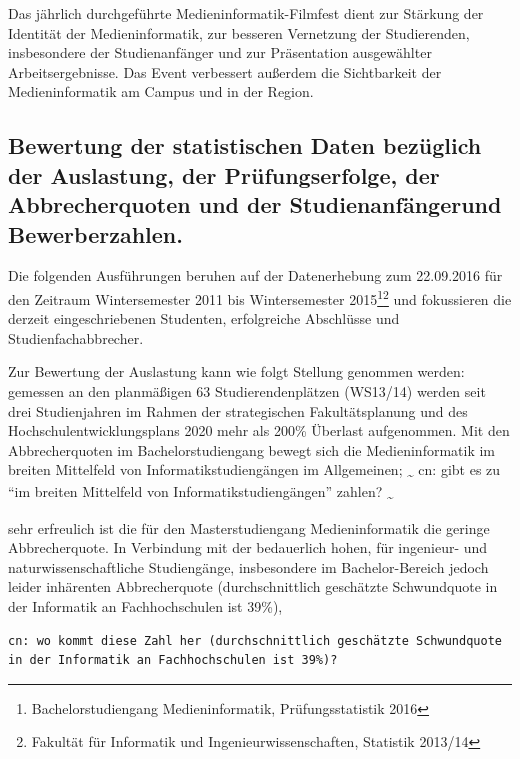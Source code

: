 Das jährlich durchgeführte Medieninformatik-Filmfest dient zur Stärkung
der Identität der Medieninformatik, zur besseren Vernetzung der
Studierenden, insbesondere der Studienanfänger und zur Präsentation
ausgewählter Arbeitsergebnisse. Das Event verbessert außerdem die
Sichtbarkeit der Medieninformatik am Campus und in der Region.

\subsection{Bewertung der statistischen Daten bezüglich der
Auslastung, der Prüfungserfolge, der Abbrecherquoten und der
Studienanfängerund
Bewerberzahlen.}\label{bewertung-der-statistischen-daten-bezuxfcglich-der-auslastung-der-pruxfcfungserfolge-der-abbrecherquoten-und-der-studienanfuxe4ngerund-bewerberzahlen.}

Die folgenden Ausführungen beruhen auf der Datenerhebung zum 22.09.2016
für den Zeitraum Wintersemester 2011 bis Wintersemester 2015\footnote{Bachelorstudiengang
  Medieninformatik, Prüfungsstatistik 2016}\footnote{Fakultät für
  Informatik und Ingenieurwissenschaften, Statistik 2013/14} und
fokussieren die derzeit eingeschriebenen Studenten, erfolgreiche
Abschlüsse und Studienfachabbrecher.

Zur Bewertung der Auslastung kann wie folgt Stellung genommen werden:
gemessen an den planmäßigen 63 Studierendenplätzen (WS13/14) werden seit
drei Studienjahren im Rahmen der strategischen Fakultätsplanung und des
Hochschulentwicklungsplans 2020 mehr als 200\% Überlast aufgenommen. Mit
den Abbrecherquoten im Bachelorstudiengang bewegt sich die
Medieninformatik im breiten Mittelfeld von Informatikstudiengängen im
Allgemeinen; \textsubscript{\textasciitilde{}} cn: gibt es zu ``im
breiten Mittelfeld von Informatikstudiengängen'' zahlen?
\textsubscript{\textasciitilde{}}

sehr erfreulich ist die für den Masterstudiengang Medieninformatik die
geringe Abbrecherquote. In Verbindung mit der bedauerlich hohen, für
ingenieur- und naturwissenschaftliche Studiengänge, insbesondere im
Bachelor-Bereich jedoch leider inhärenten Abbrecherquote
(durchschnittlich geschätzte Schwundquote in der Informatik an
Fachhochschulen ist 39\%),

\begin{verbatim}
cn: wo kommt diese Zahl her (durchschnittlich geschätzte Schwundquote in der Informatik an Fachhochschulen ist 39%)?
\end{verbatim}

